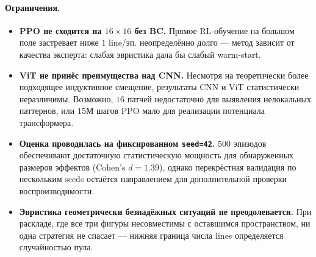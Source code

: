 \documentclass[12pt, a4paper]{article}
\begin{document}
\paragraph{Ограничения.}

\begin{itemize}
  \item \textbf{PPO не сходится на $16\times16$ без BC.} Прямое RL-обучение на большом поле застревает ниже $1$ line/эп. неопределённо долго --- метод зависит от качества эксперта: слабая эвристика дала бы слабый warm-start.
  \item \textbf{ViT не принёс преимущества над CNN.} Несмотря на теоретически более подходящее индуктивное смещение, результаты CNN и ViT статистически неразличимы. Возможно, $16$ патчей недостаточно для выявления нелокальных паттернов, или $15$М шагов PPO мало для реализации потенциала трансформера.
  \item \textbf{Оценка проводилась на фиксированном \texttt{seed=42}.} $500$ эпизодов обеспечивают достаточную статистическую мощность для обнаруженных размеров эффектов (Cohen's $d=1.39$), однако перекрёстная валидация по нескольким seeds остаётся направлением для дополнительной проверки воспроизводимости.
  \item \textbf{Эвристика геометрически безнадёжных ситуаций не преодолевается.} При раскладе, где все три фигуры несовместимы с оставшимся пространством, ни одна стратегия не спасает --- нижняя граница числа lines определяется случайностью пула.
\end{itemize}
\end{document}
